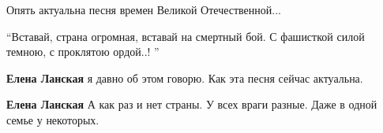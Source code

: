 \begin{itemize}

Опять актуальна песня времен Великой Отечественной...

\enquote{Вставай, страна огромная, вставай на смертный бой. С фашисткой силой
темною, с проклятою ордой..! }

\begin{itemize} %
\textbf{Елена Ланская} я давно об этом говорю. Как эта песня сейчас актуальна.

\textbf{Елена Ланская} А как раз и нет страны. У всех враги разные. Даже в одной семье у некоторых.
\end{itemize} %

\end{itemize} %
